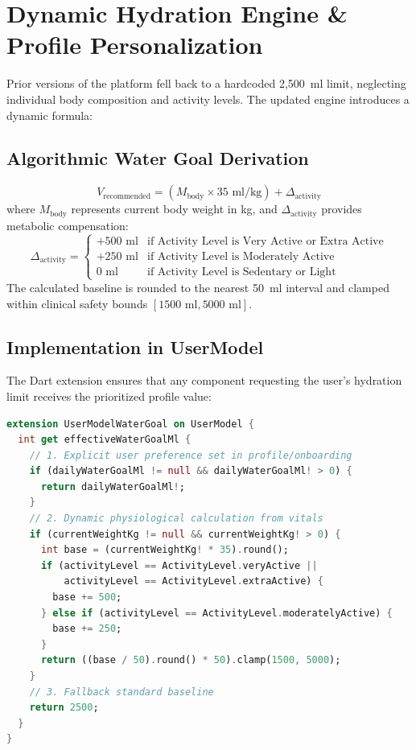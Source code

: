 \documentclass[12pt,a4paper]{article}
\begin{document}
\section{Dynamic Hydration Engine \& Profile Personalization}
Prior versions of the platform fell back to a hardcoded 2,500~ml limit, neglecting individual body composition and activity levels. The updated engine introduces a dynamic formula:

\subsection{Algorithmic Water Goal Derivation}
\begin{equation}
V_{\text{recommended}} = \left( M_{\text{body}} \times 35 \text{ ml/kg} \right) + \Delta_{\text{activity}}
\end{equation}
where $M_{\text{body}}$ represents current body weight in kg, and $\Delta_{\text{activity}}$ provides metabolic compensation:
\begin{equation}
\Delta_{\text{activity}} = 
\begin{cases} 
  +500\text{ ml} & \text{if Activity Level is Very Active or Extra Active} \\
  +250\text{ ml} & \text{if Activity Level is Moderately Active} \\
  0\text{ ml} & \text{if Activity Level is Sedentary or Light}
\end{cases}
\end{equation}
The calculated baseline is rounded to the nearest 50~ml interval and clamped within clinical safety bounds $[1500\text{ ml}, 5000\text{ ml}]$.

\subsection{Implementation in UserModel}
The Dart extension ensures that any component requesting the user's hydration limit receives the prioritized profile value:

\begin{lstlisting}[language=Dart, caption={Dynamic Hydration Extension in user\_model.dart}]
extension UserModelWaterGoal on UserModel {
  int get effectiveWaterGoalMl {
    // 1. Explicit user preference set in profile/onboarding
    if (dailyWaterGoalMl != null && dailyWaterGoalMl! > 0) {
      return dailyWaterGoalMl!;
    }
    // 2. Dynamic physiological calculation from vitals
    if (currentWeightKg != null && currentWeightKg! > 0) {
      int base = (currentWeightKg! * 35).round();
      if (activityLevel == ActivityLevel.veryActive ||
          activityLevel == ActivityLevel.extraActive) {
        base += 500;
      } else if (activityLevel == ActivityLevel.moderatelyActive) {
        base += 250;
      }
      return ((base / 50).round() * 50).clamp(1500, 5000);
    }
    // 3. Fallback standard baseline
    return 2500;
  }
}
\end{lstlisting}
\end{document}
